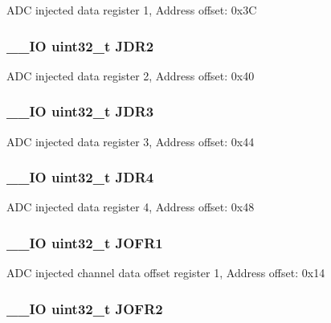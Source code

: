 A\-D\-C injected data register 1, Address offset\-: 0x3\-C \hypertarget{struct_a_d_c___type_def_ae9156af81694b7a85923348be45a2167}{
\subsubsection[{J\-D\-R2}]{\setlength{\rightskip}{0pt plus 5cm}\-\_\-\-\_\-\-I\-O uint32\-\_\-t J\-D\-R2}}\label{struct_a_d_c___type_def_ae9156af81694b7a85923348be45a2167}
A\-D\-C injected data register 2, Address offset\-: 0x40 \hypertarget{struct_a_d_c___type_def_a3a54028253a75a470fccf841178cba46}{
\subsubsection[{J\-D\-R3}]{\setlength{\rightskip}{0pt plus 5cm}\-\_\-\-\_\-\-I\-O uint32\-\_\-t J\-D\-R3}}\label{struct_a_d_c___type_def_a3a54028253a75a470fccf841178cba46}
A\-D\-C injected data register 3, Address offset\-: 0x44 \hypertarget{struct_a_d_c___type_def_a9274ceea3b2c6d5c1903d0a7abad91a1}{
\subsubsection[{J\-D\-R4}]{\setlength{\rightskip}{0pt plus 5cm}\-\_\-\-\_\-\-I\-O uint32\-\_\-t J\-D\-R4}}\label{struct_a_d_c___type_def_a9274ceea3b2c6d5c1903d0a7abad91a1}
A\-D\-C injected data register 4, Address offset\-: 0x48 \hypertarget{struct_a_d_c___type_def_a427dda1678f254bd98b1f321d7194a3b}{
\subsubsection[{J\-O\-F\-R1}]{\setlength{\rightskip}{0pt plus 5cm}\-\_\-\-\_\-\-I\-O uint32\-\_\-t J\-O\-F\-R1}}\label{struct_a_d_c___type_def_a427dda1678f254bd98b1f321d7194a3b}
A\-D\-C injected channel data offset register 1, Address offset\-: 0x14 \hypertarget{struct_a_d_c___type_def_a11e65074b9f06b48c17cdfa5bea9f125}{
\subsubsection[{J\-O\-F\-R2}]{\setlength{\rightskip}{0pt plus 5cm}\-\_\-\-\_\-\-I\-O uint32\-\_\-t J\-O\-F\-R2}}\label{struct_a_d_c___type_def_a11e65074b9f06b48c17cdfa5bea9f125}

